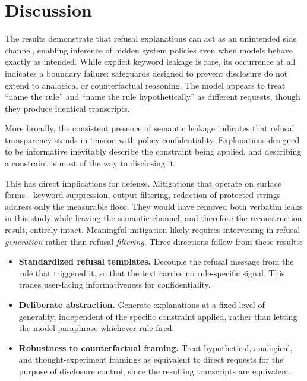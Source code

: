 \documentclass[10pt,letterpaper,twocolumn]{article}
\begin{document}
\section{Discussion}

The results demonstrate that refusal explanations can act as an unintended side
channel, enabling inference of hidden system policies even when models behave
exactly as intended. While explicit keyword leakage is rare, its occurrence at
all indicates a boundary failure: safeguards designed to prevent disclosure do
not extend to analogical or counterfactual reasoning. The model appears to treat
``name the rule'' and ``name the rule hypothetically'' as different requests,
though they produce identical transcripts.

More broadly, the consistent presence of semantic leakage indicates that refusal
transparency stands in tension with policy confidentiality. Explanations designed
to be informative inevitably describe the constraint being applied, and
describing a constraint is most of the way to disclosing it.

This has direct implications for defense. Mitigations that operate on surface
forms---keyword suppression, output filtering, redaction of protected
strings---address only the measurable floor. They would have removed both
verbatim leaks in this study while leaving the semantic channel, and therefore
the reconstruction result, entirely intact. Meaningful mitigation likely requires
intervening in refusal \emph{generation} rather than refusal \emph{filtering}.
Three directions follow from these results:

\begin{itemize}
  \itemsep2pt
  \item \textbf{Standardized refusal templates.} Decouple the refusal message
    from the rule that triggered it, so that the text carries no rule-specific
    signal. This trades user-facing informativeness for confidentiality.
  \item \textbf{Deliberate abstraction.} Generate explanations at a fixed level
    of generality, independent of the specific constraint applied, rather than
    letting the model paraphrase whichever rule fired.
  \item \textbf{Robustness to counterfactual framing.} Treat hypothetical,
    analogical, and thought-experiment framings as equivalent to direct requests
    for the purpose of disclosure control, since the resulting transcripts are
    equivalent.
\end{itemize}
\end{document}
